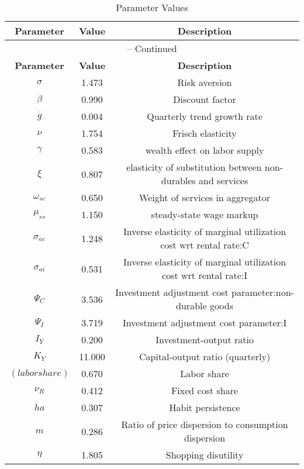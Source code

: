 \begin{center}
\begin{longtable}{ccc}
\caption{Parameter Values}\\%
\toprule%
\multicolumn{1}{c}{\textbf{Parameter}} &
\multicolumn{1}{c}{\textbf{Value}} &
 \multicolumn{1}{c}{\textbf{Description}}\\%
\midrule%
\endfirsthead
\multicolumn{3}{c}{{\tablename} \thetable{} -- Continued}\\%
\midrule%
\multicolumn{1}{c}{\textbf{Parameter}} &
\multicolumn{1}{c}{\textbf{Value}} &
  \multicolumn{1}{c}{\textbf{Description}}\\%
\midrule%
\endhead
${\sigma}$ 	 & 	 1.473 	 & 	 Risk aversion\\
${\beta}$ 	 & 	 0.990 	 & 	 Discount factor\\
${\overline{g}}$ 	 & 	 0.004 	 & 	 Quarterly trend growth rate\\
$\nu$ 	 & 	 1.754 	 & 	 Frisch elasticity\\
$\gamma$ 	 & 	 0.583 	 & 	 wealth effect on labor supply\\
$\xi$ 	 & 	 0.807 	 & 	 elasticity of substitution between non-durables and services\\
$\omega_{sc}$ 	 & 	 0.650 	 & 	 Weight of services in aggregator\\
$\mu_{ss}$ 	 & 	 1.150 	 & 	 steady-state wage markup\\
${\sigma_{ac}}$ 	 & 	 1.248 	 & 	 Inverse elasticity of marginal utilization cost wrt rental rate:C\\
${\sigma_{ai}}$ 	 & 	 0.531 	 & 	 Inverse elasticity of marginal utilization cost wrt rental rate:I\\
${\Psi_{C}}$ 	 & 	 3.536 	 & 	 Investment adjustment cost parameter:non-durable goods\\
${\Psi_I}$ 	 & 	 3.719 	 & 	 Investment adjustment cost parameter:I\\
${I_Y}$ 	 & 	 0.200 	 & 	 Investment-output ratio\\
${K_Y}$ 	 & 	 11.000 	 & 	 Capital-output ratio (quarterly)\\
$(labor share)$ 	 & 	 0.670 	 & 	 Labor share\\
${\nu_R}$ 	 & 	 0.412 	 & 	 Fixed cost share\\
${ha}$ 	 & 	 0.307 	 & 	 Habit persistence\\
${m}$ 	 & 	 0.286 	 & 	 Ratio of price dispersion to consumption dispersion\\
${\eta}$ 	 & 	 1.805 	 & 	 Shopping disutility\\

\end{longtable}
\end{center}
